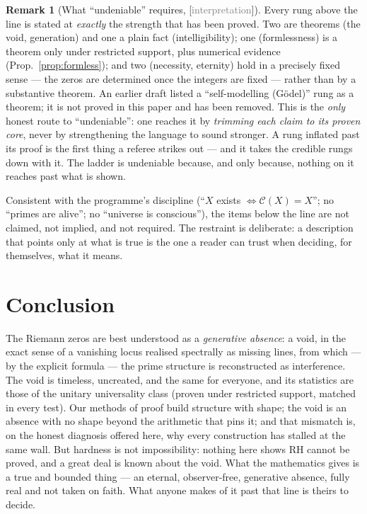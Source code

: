 \documentclass[11pt,a4paper]{article}
\theoremstyle{definition}
\newtheorem{remark}[theorem]{Remark}
\newcommand{\TAGphil}{{\small\textsf{[\textcolor{gray}{interpretation}]}}}
\begin{document}
\begin{remark}[What ``undeniable'' requires, \TAGphil]\label{rem:undeniable}
Every rung above the line is stated at \emph{exactly} the strength that has
been proved. Two are theorems (the void, generation) and one a plain fact
(intelligibility); one (formlessness) is a theorem only under restricted
support, plus numerical evidence (Prop.\ \ref{prop:formless}); and two
(necessity, eternity) hold in a precisely fixed sense --- the zeros are
determined once the integers are fixed --- rather than by a substantive
theorem. An earlier draft listed a ``self-modelling (Gödel)'' rung as a
theorem; it is not proved in this paper and has been removed. This
is the \emph{only} honest route to ``undeniable'': one reaches it by
\emph{trimming each claim to its proven core}, never by strengthening the
language to sound stronger. A rung inflated past its proof is the first thing a
referee strikes out --- and it takes the credible rungs down with it. The
ladder is undeniable because, and only because, nothing on it reaches past what
is shown.
\end{remark}

Consistent with the programme's discipline (``$X$ exists $\Leftrightarrow
\mathcal{C}(X)=X$''; no ``primes are alive''; no ``universe is conscious''),
the items below the line are not claimed, not implied, and not required. The
restraint is deliberate: a description that points only at what is true is the
one a reader can trust when deciding, for themselves, what it means.

\section*{Conclusion}
The Riemann zeros are best understood as a \emph{generative absence}: a void,
in the exact sense of a vanishing locus realised spectrally as missing lines,
from which --- by the explicit formula --- the prime structure is
reconstructed as interference. The void is timeless, uncreated, and the same
for everyone, and its statistics are those of the unitary universality class
(proven under restricted support, matched in every test). Our methods of proof
build structure with shape; the void is an absence with
no shape beyond the arithmetic that pins it; and that mismatch is, on the
honest diagnosis offered here, why every construction has stalled at the same
wall. But hardness is not impossibility: nothing here shows RH cannot be
proved, and a great deal is known about the void. What the mathematics gives
is a true and bounded thing --- an eternal, observer-free, generative absence,
fully real and not taken on faith. What anyone makes of it past that line is
theirs to decide.
\end{document}
